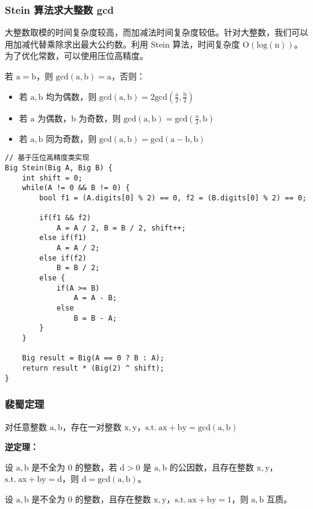 \documentclass[UTF8]{article}
\begin{document}
\subsubsection{Stein 算法求大整数 gcd}
大整数取模的时间复杂度较高，而加减法时间复杂度较低。针对大整数，我们可以用加减代替乘除求出最大公约数。利用 Stein 算法，时间复杂度 $\mathrm{O(log(n))}$。为了优化常数，可以使用压位高精度。

若 $\mathrm{a = b}$，则 $\mathrm{gcd(a,b) = a}$，否则：
\begin{itemize}
\item 若 $\mathrm{a,b}$ 均为偶数，则 $\mathrm{gcd(a,b) = 2 gcd(\frac{a}{2}, \frac{b}{2})}$
\item 若 $\mathrm{a}$ 为偶数，$\mathrm{b}$ 为奇数，则 $\mathrm{gcd(a,b) = gcd(\frac{a}{2}, b)}$
\item 若 $\mathrm{a,b}$ 同为奇数，则 $\mathrm{gcd(a,b) = gcd(a -b, b)}$
\end{itemize}
\begin{lstlisting}[caption=Stein 算法]
// 基于压位高精度类实现
Big Stein(Big A, Big B) {
    int shift = 0;
    while(A != 0 && B != 0) {
        bool f1 = (A.digits[0] % 2) == 0, f2 = (B.digits[0] % 2) == 0;

        if(f1 && f2) 
            A = A / 2, B = B / 2, shift++;
        else if(f1)
            A = A / 2;
        else if(f2) 
            B = B / 2;
        else {
            if(A >= B)
                A = A - B;
            else
                B = B - A;
        }
    }

    Big result = Big(A == 0 ? B : A);
	return result * (Big(2) ^ shift);
}
\end{lstlisting}

\subsubsection{裴蜀定理}
对任意整数 $\mathrm{a,b}$，存在一对整数 $\mathrm{x,y}$，$\mathrm{s.t. \ ax + by = gcd(a,b)}$ 

\noindent \textbf{逆定理：}

设 $\mathrm{a,b}$ 是不全为 $\mathrm{0}$ 的整数，若 $\mathrm{d > 0}$ 是 $\mathrm{a,b}$ 的公因数，且存在整数 $\mathrm{x,y}$，$\mathrm{s.t. \ ax + by = d}$，则 $\mathrm{d = gcd(a,b)}$。

设 $\mathrm{a,b}$ 是不全为 $\mathrm{0}$ 的整数，且存在整数 $\mathrm{x,y}$，$\mathrm{s.t. \ ax + by = 1}$，则 $\mathrm{a,b}$ 互质。
\end{document}
